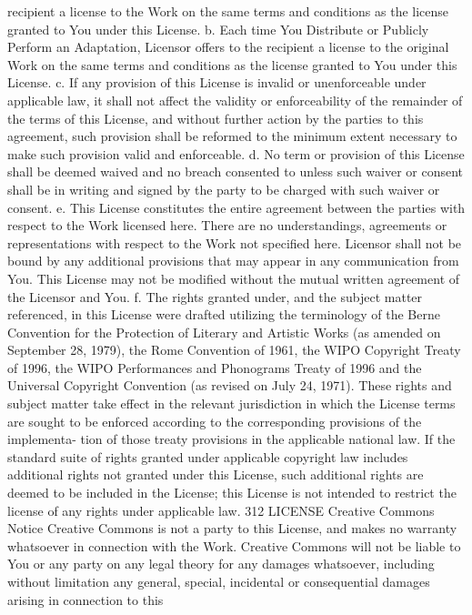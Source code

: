 \documentclass[oneside]{book}
\begin{document}
recipient a license to the Work on the same terms and conditions as the license
granted to You under this License.  b. Each time You Distribute or Publicly
Perform an Adaptation, Licensor offers to the recipient a license to the
original Work on the same terms and conditions as the license granted to You
under this License.  c. If any provision of this License is invalid or
unenforceable under applicable law, it shall not affect the validity or
enforceability of the remainder of the terms of this License, and without
further action by the parties to this agreement, such provision shall be
reformed to the minimum extent necessary to make such provision valid and
enforceable.  d. No term or provision of this License shall be deemed waived and
no breach consented to unless such waiver or consent shall be in writing and
signed by the party to be charged with such waiver or consent.  e. This License
constitutes the entire agreement between the parties with respect to the Work
licensed here. There are no understandings, agreements or representations with
respect to the Work not specified here. Licensor shall not be bound by any
additional provisions that may appear in any communication from You. This
License may not be modified without the mutual written agreement of the Licensor
and You.  f. The rights granted under, and the subject matter referenced, in
this License were drafted utilizing the terminology of the Berne Convention for
the Protection of Literary and Artistic Works (as amended on September 28,
1979), the Rome Convention of 1961, the WIPO Copyright Treaty of 1996, the WIPO
Performances and Phonograms Treaty of 1996 and the Universal Copyright
Convention (as revised on July 24, 1971). These rights and subject matter take
effect in the relevant jurisdiction in which the License terms are sought to be
enforced according to the corresponding provisions of the implementa- tion of
those treaty provisions in the applicable national law. If the standard suite of
rights granted under applicable copyright law includes additional rights not
granted under this License, such additional rights are deemed to be included in
the License; this License is not intended to restrict the license of any rights
under applicable law.  312 LICENSE Creative Commons Notice Creative Commons is
not a party to this License, and makes no warranty whatsoever in connection with
the Work. Creative Commons will not be liable to You or any party on any legal
theory for any damages whatsoever, including without limitation any general,
special, incidental or consequential damages arising in connection to this
\end{document}
